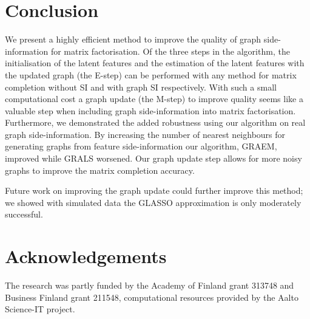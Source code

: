 \documentclass{article}
\theoremstyle{plain}
\theoremstyle{definition}
\theoremstyle{remark}
\begin{document}
\section{Conclusion} \label{sec:conclusion}
We present a highly efficient method to improve the quality of graph side-information for matrix factorisation. Of the three steps in the algorithm, the initialisation of the latent features and the estimation of the latent features with the updated graph (the E-step) can be performed with any method for matrix completion without SI and with graph SI respectively. With such a small computational cost a graph update (the M-step) to improve quality seems like a valuable step when including graph side-information into matrix factorisation.  Furthermore, we demonstrated the added robustness using our algorithm on real graph side-information. By increasing the number of nearest neighbours for generating graphs from feature side-information our algorithm, GRAEM, improved while GRALS worsened. Our graph update step allows for more noisy graphs to improve the matrix completion accuracy.


Future work on improving the graph update could further improve this method; we showed with simulated data the GLASSO approximation is only moderately successful. 

\section{Acknowledgements}
The research was partly funded by the Academy of Finland grant 313748 and Business Finland grant 211548, computational resources provided by the Aalto Science-IT project.

\newpage






\newpage




\end{document}
